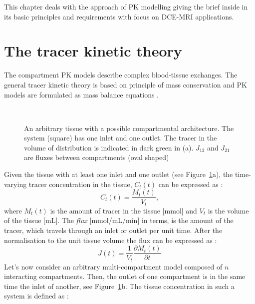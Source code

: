 This chapter deals with the approach of PK modelling giving the brief inside in its basic principles and requirements with focus on DCE-MRI applications. 
\newpage



\section{The tracer kinetic theory} 
The compartment PK models describe complex blood-tissue exchanges. The general tracer kinetic theory is based on  principle of mass conservation and PK models are formulated as mass balance equations \cite{khalifa2014models, thesis}. 
\begin{figure}[H]
\captionsetup[subfloat]{captionskip=0.5cm}
	\centering
	\\	
\vspace{0.5cm}
\caption[An arbitrary multi-compartment model]{An arbitrary tissue with a possible compartmental architecture. The system (square) has one inlet and one outlet.
The tracer in the volume of distribution is
indicated in dark green in (a). $J_{12}$ and $J_{21}$ are fluxes between compartments (oval shaped)}
\label{fig:model}
\end{figure}
\noindent Given the tissue with at least one inlet and one outlet (see Figure~\ref{fig:model}a), the time-varying tracer concentration in the tissue, $C_t(t)$ can be expressed as \cite{thesis}:
\begin{equation}
C_t(t) = \frac{M_t(t)}{V_t},
\label{eq:pk1}
\end{equation}
where $M_t(t)$ is the amount of tracer in the tissue [mmol] and $V_t$ is the volume of the tissue [mL]. The \textit{flux} [mmol/mL/min] in terms, is the amount of the tracer, which travels through an inlet or outlet per unit time. After the normalisation to the unit tissue volume the flux can be expressed as \cite{thesis}:
\begin{equation}
J(t) = \frac{1}{V_t}\frac{\partial M_t(t)}{\partial t}
\label{eq:pk2}
\end{equation} 
Let's now consider an arbitrary multi-compartment model composed of $n$ interacting compartments. Then, the outlet of one compartment is in the same time the inlet of another, see Figure~\ref{fig:model}b. The tissue concentration in such a system is defined as \cite{thesis}:   
